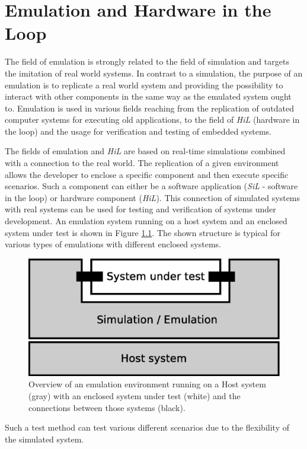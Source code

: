 \chapter{Emulation and Hardware in the Loop}
\label{cha:emulation}

The field of emulation is strongly related to the field of simulation and targets the imitation of real world systems.
In contrast to a simulation, the purpose of an emulation is to replicate a real world system and providing the possibility to interact with other components in the same way as the emulated system ought to.
Emulation is used in various fields reaching from the replication of outdated computer systems for executing old applications, to the field of \emph{HiL} (hardware in the loop) and the usage for verification and testing of embedded systems. \cite{emulation_koninklijke}

The fields of emulation and \emph{HiL} are based on real-time simulations combined with a connection to the real world.
The replication of a given environment allows the developer to enclose a specific component and then execute specific scenarios.
Such a component can either be a software application (\emph{SiL} - software in the loop) or hardware component (\emph{HiL}).
This connection of simulated systems with real systems can be used for testing and verification of systems under development.
An emulation system running on a host system and an enclosed system under test is shown in Figure \ref{fig:emulation_overview}.
The shown structure is typical for various types of emulations with different enclosed systems.

\begin{figure}
\centering
\includegraphics[width=0.7\linewidth]{images/emulation_overview}
\caption{Overview of an emulation environment running on a Host system (gray) with an enclosed system under test (white) and the connections between those systems (black).}
\label{fig:emulation_overview}
\end{figure}



Such a test method can test various different scenarios due to the flexibility of the simulated system.
\cite[section I]{lu_low-cost_2007}

